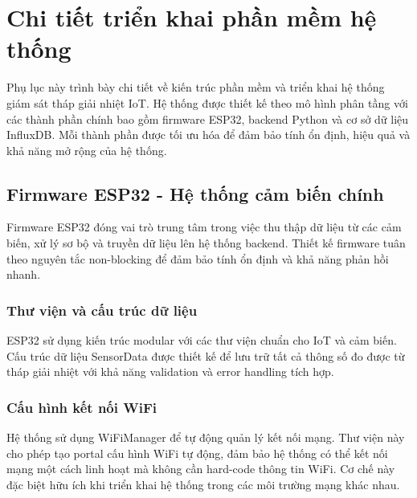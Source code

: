 \documentclass[../main.tex]{subfiles}
\begin{document}
\section{Chi tiết triển khai phần mềm hệ thống}
\label{sec:software_implementation}

Phụ lục này trình bày chi tiết về kiến trúc phần mềm và triển khai hệ thống giám sát tháp giải nhiệt IoT. Hệ thống được thiết kế theo mô hình phân tầng với các thành phần chính bao gồm firmware ESP32, backend Python và cơ sở dữ liệu InfluxDB. Mỗi thành phần được tối ưu hóa để đảm bảo tính ổn định, hiệu quả và khả năng mở rộng của hệ thống.

\subsection{Firmware ESP32 - Hệ thống cảm biến chính}
\label{sec:esp32_firmware}

Firmware ESP32 đóng vai trò trung tâm trong việc thu thập dữ liệu từ các cảm biến, xử lý sơ bộ và truyền dữ liệu lên hệ thống backend. Thiết kế firmware tuân theo nguyên tắc non-blocking để đảm bảo tính ổn định và khả năng phản hồi nhanh.

\subsubsection{Thư viện và cấu trúc dữ liệu}
\label{sec:libraries_data_structures}

ESP32 sử dụng kiến trúc modular với các thư viện chuẩn cho IoT và cảm biến. Cấu trúc dữ liệu SensorData được thiết kế để lưu trữ tất cả thông số đo được từ tháp giải nhiệt với khả năng validation và error handling tích hợp.



\subsubsection{Cấu hình kết nối WiFi}
\label{sec:wifi_configuration}

Hệ thống sử dụng WiFiManager để tự động quản lý kết nối mạng. Thư viện này cho phép tạo portal cấu hình WiFi tự động, đảm bảo hệ thống có thể kết nối mạng một cách linh hoạt mà không cần hard-code thông tin WiFi. Cơ chế này đặc biệt hữu ích khi triển khai hệ thống trong các môi trường mạng khác nhau.


\end{document}
